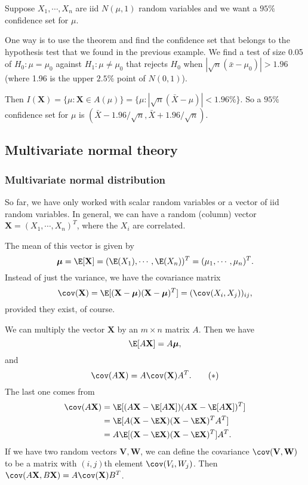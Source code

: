 \documentclass[a4paper]{article}
\begin{document}
\begin{eg}
  Suppose $X_1, \cdots, X_n$ are iid $N(\mu, 1)$ random variables and we want a $95\%$ confidence set for $\mu$.

  One way is to use the theorem and find the confidence set that belongs to the hypothesis test that we found in the previous example. We find a test of size 0.05 of $H_0 : \mu= \mu_0$ against $H_1: \mu\not= \mu_0$ that rejects $H_0$ when $|\sqrt{n}(\bar x - \mu_0)| > 1.96$ (where 1.96 is the upper $2.5\%$ point of $N(0, 1)$).

  Then $I(\mathbf{X}) = \{\mu: \mathbf{X}\in A(\mu)\} = \{\mu:|\sqrt{n}(\bar X - \mu)| < 1.96\%\}$. So a $95\%$ confidence set for $\mu$ is $(\bar X - 1.96/\sqrt{n}, \bar X + 1.96/\sqrt{n})$.
\end{eg}
\subsection{Multivariate normal theory}
\subsubsection{Multivariate normal distribution}
So far, we have only worked with scalar random variables or a vector of iid random variables. In general, we can have a random (column) vector $\mathbf{X} = (X_1, \cdots, X_n)^T$, where the $X_i$ are correlated.

The mean of this vector is given by
\[
  \boldsymbol\mu = \E[\mathbf{X}] = (\E(X_1), \cdots, \E(X_n))^T = (\mu_1, \cdots, \mu_n)^T.
\]
Instead of just the variance, we have the covariance matrix
\[
  \cov (\mathbf{X}) = \E[(\mathbf{X} - \boldsymbol\mu)(\mathbf{X} - \boldsymbol\mu)^T] = (\cov(X_i, X_j))_{ij},
\]
provided they exist, of course.

We can multiply the vector $\mathbf{X}$ by an $m\times n$ matrix $A$. Then we have
\[
  \E[A\mathbf{X}] = A\boldsymbol\mu,
\]
and
\[
  \cov (A\mathbf{X}) = A\cov(\mathbf{X})A^T.\tag{$*$}
\]
The last one comes from
\begin{align*}
  \cov(A\mathbf{X}) &= \E[(A\mathbf{X} -\E[A\mathbf{X}])(A\mathbf{X} - \E[A\mathbf{X}])^T] \\
  &= \E[A(\mathbf{X} - \E\mathbf{X})(\mathbf{X} - \E\mathbf{X})^T A^T]\\
  &= A\E[(\mathbf{X} - \E\mathbf{X})(\mathbf{X} - \E\mathbf{X})^T]A^T.
\end{align*}
If we have two random vectors $\mathbf{V}, \mathbf{W}$, we can define the covariance $\cov(\mathbf{V}, \mathbf{W})$ to be a matrix with $(i, j)$th element $\cov(V_i, W_j)$. Then $\cov(A\mathbf{X}, B\mathbf{X}) = A\cov (\mathbf{X}) B^T$.
\end{document}
